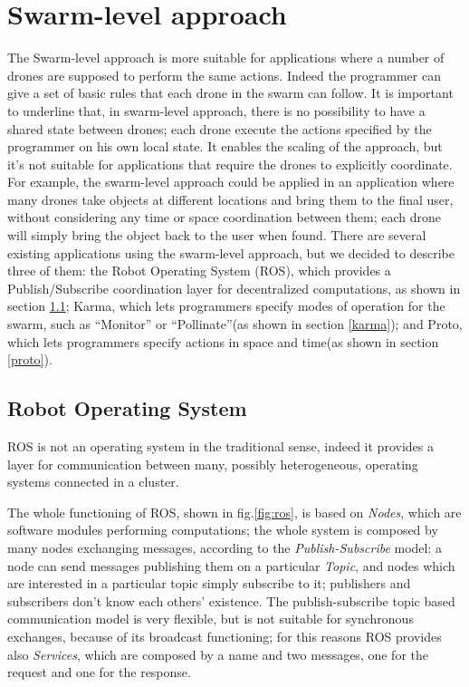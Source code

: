 \section{Swarm-level approach}\label{swarmLevel}

The Swarm-level approach\cite{swarm} is more suitable for applications where a number of drones are supposed to perform the same actions. Indeed the programmer can give a set of basic rules that each drone in the swarm can follow.
It is important to underline that, in swarm-level approach, there is no possibility to have a shared state between drones; each drone execute the actions specified by the programmer on his own local state.
It enables the scaling of the approach, but it's not suitable for applications that require the drones to explicitly coordinate.
For example, the swarm-level approach could be applied in an application where many drones take objects at different locations and bring them to the final user, without considering any time or space coordination between them; each drone will simply bring the object back to the user when found.  
There are several existing applications using the swarm-level approach, but we decided to describe three of them:
the Robot Operating System (ROS)\cite{ros}, which provides a Publish/Subscribe coordination layer for decentralized computations, as shown in section \ref{ros}; Karma\cite{karma}, which lets programmers specify modes of operation for the swarm, such as “Monitor” or “Pollinate”(as shown in section \ref{karma}); and Proto\cite{proto}, which lets programmers specify actions in space and time(as shown in section \ref{proto}). 

\subsection{Robot Operating System}\label{ros}

ROS\cite{ros} is not an operating system in the traditional sense, indeed it provides a layer for communication between many, possibly heterogeneous, operating systems connected in a cluster.

The whole functioning of ROS, shown in fig.\ref{fig:ros}, is based on \textit{Nodes}, which are software modules performing computations; the whole system is composed by many nodes exchanging messages, according to the \textit{Publish-Subscribe} model:
a node can send messages publishing them on a particular \textit{Topic}, and nodes which are interested in a particular topic simply subscribe to it; publishers and subscribers don't know each others' existence.
The publish-subscribe topic based communication model is very flexible, but is not suitable for synchronous exchanges, because of its broadcast functioning; for this reasons ROS provides also \textit{Services}, which are composed by a name and two messages, one for the request and one for the response.





